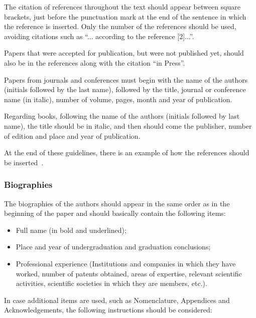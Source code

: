 \documentclass[english]{sobraep}
\begin{document}
The citation of references throughout the text should appear between square brackets, just before the punctuation mark at the end of the sentence in which the reference is inserted. Only the number of the references should be used, avoiding citations such as ``... according to the reference [2]...''.

Papers that were accepted for publication, but were not published yet, should also be in the references along with the citation ``in Press''.

Papers from journals and conferences must begin with the name of the authors (initials followed by the last name), followed by the title, journal or conference name (in italic), number of volume, pages, month and year of publication.

Regarding books, following the name of the authors (initials followed by last name), the title should be in italic, and then should come the publisher, number of edition and place and year of publication.

At the end of these guidelines, there is an example of how the references should be inserted~\cite{refbib1,refbib2,refbib3,refbib4,refbib5,refbib6,refbib7,refbib8}.




\subsubsection{Biographies}

The biographies of the authors should appear in the same order as in the beginning of the paper and should basically contain the following items:
\begin{itemize}
	\item Full name (in bold and underlined);
	\item Place and year of undergraduation and graduation conclusions;
	\item Professional experience (Institutions and companies in which they have worked, number of patents obtained, areas of expertise, relevant scientific activities, scientific societies in which they are members, etc.). \newline
\end{itemize}

In case additional items are used, such as Nomenclature, Appendices and Acknowledgements, the following instructions should be considered:
\end{document}
